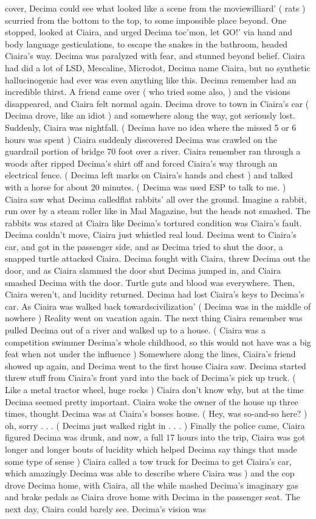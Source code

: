 \documentclass[12pt]{book}
\begin{document}
cover, Decima could see what looked like a scene from the moviewilliard' ( rats ) scurried from the bottom to the top, to some impossible place beyond. One stopped, looked at Ciaira, and urged Decima toc'mon, let GO!' via hand and body language gesticulations, to escape the snakes in the bathroom, headed Ciaira's way. Decima was paralyzed with fear, and stunned beyond belief. Ciaira had did a lot of LSD, Mescaline, Microdot, Decima name Ciaira, but no synthetic hallucinogenic had ever was even anything like this. Decima remember had an incredible thirst. A friend came over ( who tried some also, ) and the visions disappeared, and Ciaira felt normal again. Decima drove to town in Ciaira's car ( Decima drove, like an idiot ) and somewhere along the way, got seriously lost. Suddenly, Ciaira was nightfall. ( Decima have no idea where the missed 5 or 6 hours was spent ) Ciaira suddenly discovered Decima was crawled on the guardrail portion of bridge 70 foot over a river. Ciaira remember ran through a woods after ripped Decima's shirt off and forced Ciaira's way through an electrical fence. ( Decima left marks on Ciaira's hands and chest ) and talked with a horse for about 20 minutes. ( Decima was used ESP to talk to me. ) Ciaira saw what Decima calledflat rabbits' all over the ground. Imagine a rabbit, run over by a steam roller like in Mad Magazine, but the heads not smashed. The rabbits was stared at Ciaira like Decima's tortured condition was Ciaira's fault. Decima couldn't move, Ciaira just whistled real loud. Decima went to Ciaira's car, and got in the passenger side, and as Decima tried to shut the door, a snapped turtle attacked Ciaira. Decima fought with Ciaira, threw Decima out the door, and as Ciaira slammed the door shut Decima jumped in, and Ciaira smashed Decima with the door. Turtle guts and blood was everywhere. Then, Ciaira weren't, and lucidity returned. Decima had lost Ciaira's keys to Decima's car. As Ciaira was walked back towardscivilization' ( Decima was in the middle of nowhere ) Reality went on vacation again. The next thing Ciaira remember was pulled Decima out of a river and walked up to a house. ( Ciaira was a competition swimmer Decima's whole childhood, so this would not have was a big feat when not under the influence ) Somewhere along the lines, Ciaira's friend showed up again, and Decima went to the first house Ciaira saw. Decima started threw stuff from Ciaira's front yard into the back of Decima's pick up truck. ( Like a metal tractor wheel, huge rocks ) Ciaira don't know why, but at the time Decima seemed pretty important. Ciaira woke the owner of the house up three times, thought Decima was at Ciaira's bosses house. ( Hey, was so-and-so here? ) oh, sorry . . .  ( Decima just walked right in . . .   ) Finally the police came, Ciaira figured Decima was drunk, and now, a full 17 hours into the trip, Ciaira was got longer and longer bouts of lucidity which helped Decima say things that made some type of sense ) Ciaira called a tow truck for Decima to get Ciaira's car, which amazingly Decima was able to describe where Ciaira was ) and the cop drove Decima home, with Ciaira, all the while mashed Decima's imaginary gas and brake pedals as Ciaira drove home with Decima in the passenger seat. The next day, Ciaira could barely see. Decima's vision was 
\end{document}
